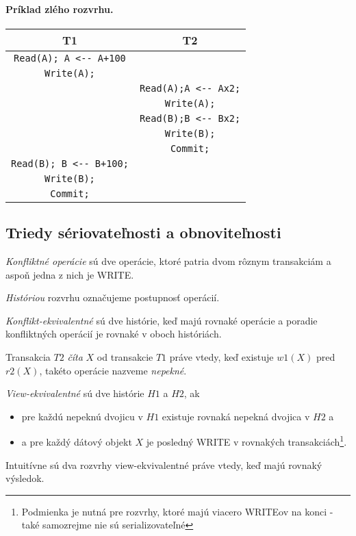\documentclass[10pt,a4paper]{article}
\begin{document}
\paragraph{Príklad zlého rozvrhu.}
\begin{center}
\begin{tabular}{c|c}
T1 & T2 \\
\hline
\verb|Read(A); A <-- A+100| & \\
\verb|Write(A);| & \\
& \verb|Read(A);A <-- Ax2;| \\
& \verb|Write(A);| \\
& \verb|Read(B);B <-- Bx2;| \\
& \verb|Write(B);| \\
& \verb|Commit;| \\
\verb|Read(B); B <-- B+100;| & \\
\verb|Write(B);| & \\
\verb|Commit;| & \\
\end{tabular}
\end{center}

\subsection{Triedy sériovateľnosti a obnoviteľnosti}

\emph{Konfliktné operácie} sú dve operácie, ktoré patria dvom rôznym transakciám a aspoň jedna z nich je WRITE. 

\emph{Históriou} rozvrhu označujeme postupnosť operácií. 

\emph{Konflikt-ekvivalentné} sú dve histórie, keď majú rovnaké operácie a poradie konfliktných operácií je rovnaké v oboch históriách. 

Transakcia $T2$ \emph{číta} $X$ od transakcie $T1$ práve vtedy, keď existuje $w1(X)$ pred $r2(X)$,
takéto operácie nazveme \emph{nepekné}. 

\emph{View-ekvivalentné} sú dve histórie $H1$ a $H2$, ak 
\begin{itemize}
\item pre každú nepeknú dvojicu v $H1$ existuje rovnaká nepekná dvojica v $H2$ a
\item a pre každý dátový objekt $X$ je posledný WRITE v rovnakých transakciách\footnote{Podmienka je nutná pre rozvrhy, ktoré majú viacero WRITEov na konci - také samozrejme nie sú serializovateľné}. 
\end{itemize}
Intuitívne sú dva rozvrhy view-ekvivalentné práve vtedy, keď majú rovnaký výsledok. 
\end{document}
